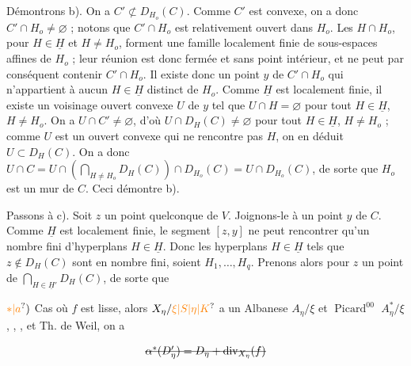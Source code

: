 Démontrons b). On a $C'\not\subset D_{H_o}(C)$. Comme $C'$ est convexe, on a donc $C'\cap H_o\ne\varnothing$ ; notons que $C'\cap H_o$ est relativement ouvert dans $H_o$. Les $H\cap H_o$, pour $H\in\underline H$ et $H\ne H_o$, forment une famille localement finie de sous-espaces affines de $H_o$ ; leur réunion est donc fermée et sans point intérieur, et ne peut par conséquent contenir $C'\cap H_o$. Il existe donc un point $y$ de $C'\cap H_o$ qui n'appartient à aucun $H\in\underline H$ distinct de $H_o$. Comme $\underline H$ est localement finie, il existe un voisinage ouvert convexe $U$ de $y$ tel que $U\cap H=\varnothing$ pour tout $H\in\underline H$, $H\ne H_o$. On a $U\cap C'\ne\varnothing$, d'où $U\cap D_H(C)\ne\varnothing$ pour tout $H\in\underline H$, $H\ne H_o$ ; comme $U$ est un ouvert convexe qui ne rencontre pas $H$, on en déduit $U\subset D_H(C)$. On a donc $U\cap C=U\cap(\displaystyle\bigcap_{H\ne H_o}D_H(C))\cap D_{H_o}(C)=U\cap D_{H_o}(C)$, de sorte que $H_o$ est un mur de $C$. Ceci démontre b).

Passons à c). Soit $z$ un point quelconque de $V$. Joignons-le à un point $y$ de $C$. Comme $\underline H$ est localement finie, le segment $[z,y]$ ne peut rencontrer qu'un nombre fini \margin{\handwritten{$\vert$}}d'hyperplans $H\in\underline H$. Donc les hyperplans $H\in\underline H$ tels que $z\notin D_H(C)$ sont en nombre fini, soient $H_1,\ldots,H_q$. Prenons alors pour $z$ un point de $\displaystyle\bigcap_{H\in\underline H'}D_H(C)$, de sorte que

$\unsure{*|a})$ Cas où $f$ est lisse, alors $X_{\eta}/\unsure{\xi|S|\eta|K}$ a un Albanese $A_{\eta}/\xi$ et $\operatorname{Picard}^{00}$ $A_{\eta}^{*}/\xi$, ,  ,  et Th. de Weil, on a


 


\[
\deleted{\alpha^*(D'_{\eta})=D_{\eta}+\operatorname{div}_{X_{\eta}}(f)}
\]

